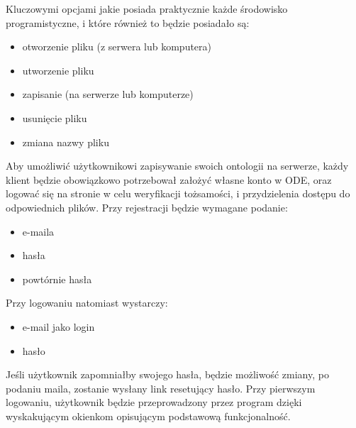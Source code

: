 \documentclass[a4paper,12pt, twoside]{book} %
\begin{document}
Kluczowymi opcjami jakie posiada praktycznie każde środowisko programistyczne, i które również to będzie posiadało są:
\begin{itemize}
	\item otworzenie pliku (z serwera lub komputera)
	\item utworzenie pliku
	\item zapisanie (na serwerze lub komputerze)
	\item usunięcie pliku
	\item zmiana nazwy pliku
\end{itemize}
Aby umożliwić użytkownikowi zapisywanie swoich ontologii na serwerze, każdy klient będzie obowiązkowo potrzebował założyć własne konto w ODE, oraz logować się na stronie w celu weryfikacji tożsamości, i przydzielenia dostępu do odpowiednich plików. Przy rejestracji będzie wymagane podanie:
\begin{itemize}
	\item e-maila 
	\item hasła
	\item powtórnie hasła
\end{itemize}
Przy logowaniu natomiast wystarczy:
\begin{itemize}
	\item e-mail jako login
	\item hasło
\end{itemize}
Jeśli użytkownik zapomniałby swojego hasła, będzie możliwość zmiany, po podaniu maila, zostanie wysłany link resetujący hasło. Przy pierwszym logowaniu, użytkownik będzie przeprowadzony przez program dzięki wyskakującym okienkom opisującym podstawową funkcjonalność.
\end{document}
